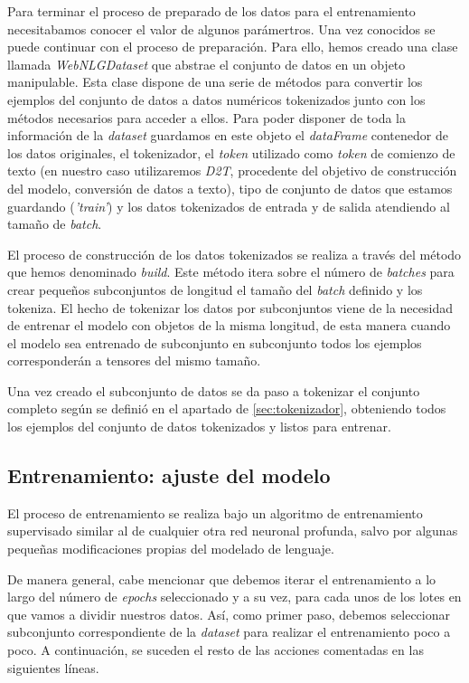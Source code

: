 Para terminar el proceso de preparado de los datos para el entrenamiento necesitabamos conocer el valor de algunos parámertros. Una vez conocidos se puede continuar con el proceso de preparación. Para ello, hemos creado una clase llamada \textit{WebNLGDataset} que abstrae el conjunto de datos en un objeto manipulable. Esta clase dispone de una serie de métodos para convertir los ejemplos del conjunto de datos a datos numéricos tokenizados junto con los métodos necesarios para acceder a ellos. Para poder disponer de toda la información de la \textit{dataset} guardamos en este objeto el \textit{dataFrame} contenedor de los datos originales, el tokenizador, el \textit{token} utilizado como \textit{token} de comienzo de texto (en nuestro caso utilizaremos \textit{D2T}, procedente del objetivo de construcción del modelo, conversión de datos a texto), tipo de conjunto de datos que estamos guardando (\textit{'train'}) y los datos tokenizados de entrada y de salida atendiendo al tamaño de \textit{batch}. 

El proceso de construcción de los datos tokenizados se realiza a través del método que hemos denominado \textit{build}. Este método itera sobre el número de \textit{batches} para crear pequeños subconjuntos de longitud el tamaño del \textit{batch} definido y los tokeniza. El hecho de tokenizar los datos por subconjuntos viene de la necesidad de entrenar el modelo con objetos de la misma longitud, de esta manera cuando el modelo sea entrenado de subconjunto en subconjunto todos los ejemplos corresponderán a tensores del mismo tamaño. 


Una vez creado el subconjunto de datos se da paso a tokenizar el conjunto completo según se definió en el apartado de \ref{sec:tokenizador}, obteniendo todos los ejemplos del conjunto de datos tokenizados y listos para entrenar.



\subsection{Entrenamiento: ajuste del modelo}

El proceso de entrenamiento se realiza bajo un algoritmo de entrenamiento supervisado similar al de cualquier otra red neuronal profunda, salvo por algunas pequeñas modificaciones propias del modelado de lenguaje.

De manera general, cabe mencionar que debemos iterar el entrenamiento a lo largo del número de \textit{epochs} seleccionado y a su vez, para cada unos de los lotes en que vamos a dividir nuestros datos. Así, como primer paso, debemos seleccionar subconjunto correspondiente de la \textit{dataset} para realizar el entrenamiento poco a poco. A continuación, se suceden el resto de las acciones comentadas en las siguientes líneas.

